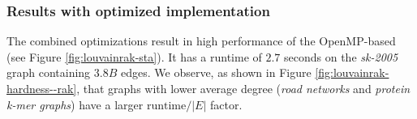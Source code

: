\subsubsection{Results with optimized implementation}

The combined optimizations result in high performance of the OpenMP-based \StaLPA{} (see Figure \ref{fig:louvainrak-sta}). It has a runtime of $2.7$ seconds on the \textit{sk-2005} graph containing $3.8 B$ edges. We observe, as shown in Figure \ref{fig:louvainrak-hardness--rak}, that graphs with lower average degree (\textit{road networks} and \textit{protein k-mer graphs}) have a larger $\text{runtime}/|E|$ factor.
